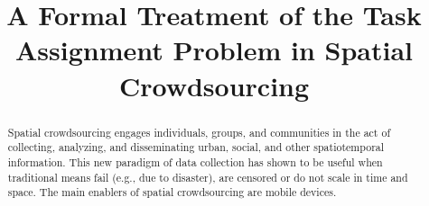 \documentclass{sig-alternate}
\title{A Formal Treatment of the Task Assignment Problem in Spatial Crowdsourcing}
\begin{document}

\maketitle
\begin{abstract}
Spatial crowdsourcing engages individuals, groups, and communities in the act of collecting, analyzing, and disseminating urban, social, and other spatiotemporal information. This new paradigm of data collection has shown to be useful when traditional means fail (e.g., due to disaster), are censored or do not scale in time and space.  The main enablers of spatial crowdsourcing are mobile devices. 





\end{abstract}
\end{document}
